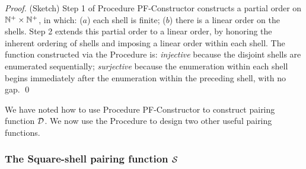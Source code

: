 \begin{proof}(Sketch) Step 1 of Procedure {\small\sf PF-Constructor}
constructs a partial order on $\mathbb{N}^+ \times \mathbb{N}^+$, in which: ($a$) each
shell is finite; ($b$) there is a linear order on the shells.  Step 2
extends this partial order to a linear order, by honoring the inherent
ordering of shells and imposing a linear order within each shell.  The
function constructed via the Procedure is: {\em injective} because the
disjoint shells are enumerated sequentially; {\em surjective} because
the enumeration within each shell begins immediately after the
enumeration within the preceding shell, with no gap.  \qed
\end{proof}

\bigskip

We have noted how to use Procedure {\small\sf PF-Constructor} to
construct pairing function $\mbox{$\cal D$}$.  We now use the Procedure to design
two other useful pairing functions.

\subsubsection{The Square-shell pairing function $\mbox{$\cal S$}$}
\label{sec:square-pair-fn}

